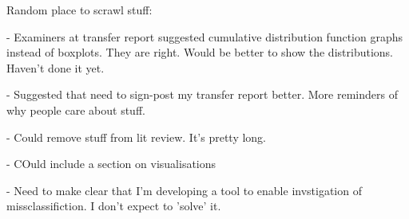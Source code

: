 Random place to scrawl stuff:

- Examiners at transfer report suggested cumulative distribution function graphs instead of boxplots. They are right. Would be better to show the distributions. Haven't done it yet.

- Suggested that need to sign-post my transfer report better. More reminders of why people care about stuff.

- Could remove stuff from lit review. It's pretty long.

- COuld include a section on visualisations

- Need to make clear that I'm developing a tool to enable invstigation of missclassifiction. I don't expect to 'solve' it.